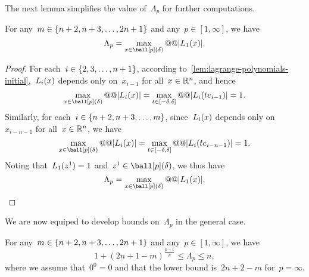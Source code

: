 The next lemma simplifies the value of~$\Lambda_p$ for further computations.

\begin{lemma}
    \label{lem:lambda-poisedness-initial-simple}
    For any~$m \in \{n + 2, n + 3, \dots, 2n + 1\}$ and any~$p \in [1, \infty]$, we have
    \begin{equation}
        \label{eq:lambda-poisedness-initial-simple}
        \Lambda_p = \max_{\iter \in \ball[p](\delta)} @@ \abs{\lagp[1](\iter)}.
    \end{equation}
\end{lemma}

\begin{proof}
    For each~$i \in \{2, 3, \dots, n + 1\}$, according to~\cref{lem:lagrange-polynomials-initial},~$\lagp[i](\iter)$ depends only on~$x_{i - 1}$ for all~$\iter \in \R^n$, and hence
    \begin{equation*}
        \max_{\iter \in \ball[p](\delta)} @@ \abs{\lagp[i](\iter)} = \max_{t \in [-\delta, \delta]} @@ \abs{\lagp[i](t e_{i - 1})} = 1.
    \end{equation*}
    Similarly, for each~$i \in \{n + 2, n + 3, \dots, m\}$, since~$\lagp[i](\iter)$ depends only on~$x_{i - n - 1}$ for all~$\iter \in \R^n$, we have
    \begin{equation*}
        \max_{\iter \in \ball[p](\delta)} @@ \abs{\lagp[i](\iter)} = \max_{t \in [-\delta, \delta]} @@ \abs{\lagp[i](t e_{i - n - 1})} = 1.
    \end{equation*}
    Noting that~$\lagp[1](z^1) = 1$ and~$z^1 \in \ball[p](\delta)$, we thus have
    \begin{equation*}
        \Lambda_p = \max_{\iter \in \ball[p](\delta)} @@ \abs{\lagp[1](\iter)}.
    \end{equation*}
\end{proof}

We are now equiped to develop bounds on~$\Lambda_p$ in the general case.

\begin{theorem}
    \label{thm:lambda-poisedness-initial}
    For any~$m \in \{n + 2, n + 3, \dots, 2n + 1\}$ and any~$p \in [1, \infty]$, we have
    \begin{equation*}
        1 + (2n + 1 - m)^{\frac{p - 1}{p}} \le \Lambda_p \le n,
    \end{equation*}
    where we assume that~$0^0 = 0$ and that the lower bound is~$2n + 2 - m$ for~$p = \infty$.
\end{theorem}

